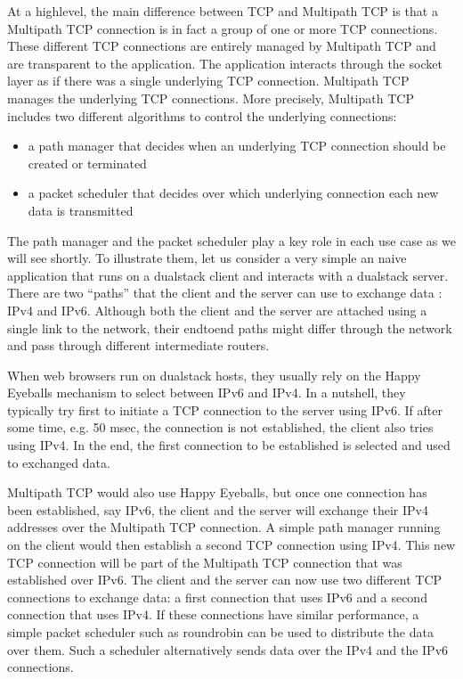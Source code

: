\documentclass[letterpaper,10pt,english]{sphinxmanual}
\begin{document}
\sphinxAtStartPar
At a high\sphinxhyphen{}level, the main difference between TCP and Multipath TCP is that a Multipath TCP connection is in fact a group of one or more TCP connections. These different TCP connections are entirely managed by Multipath TCP and are transparent to the application. The application interacts through the socket layer as if there was a single underlying TCP connection. Multipath TCP manages the underlying TCP connections. More precisely, Multipath TCP includes two different algorithms to control the underlying connections:
\begin{itemize}
\item {} 
\sphinxAtStartPar
a path manager that decides when an underlying TCP connection should be created or terminated

\item {} 
\sphinxAtStartPar
a packet scheduler that decides over which underlying connection each new data is transmitted

\end{itemize}

\sphinxAtStartPar
The path manager and the packet scheduler play a key role in each use case as we will see shortly. To illustrate them, let us consider a very simple an naive application that runs on a dual\sphinxhyphen{}stack client and interacts with a dual\sphinxhyphen{}stack server. There are two “paths” that the client and the server can use to exchange data : IPv4 and IPv6. Although both the client and the server are attached using a single link to the network, their end\sphinxhyphen{}to\sphinxhyphen{}end paths might differ through the network and pass through different intermediate routers.

\sphinxAtStartPar
When web browsers run on dual\sphinxhyphen{}stack hosts, they usually rely on the Happy Eyeballs mechanism to select between IPv6 and IPv4. In a nutshell, they typically try first to initiate a TCP connection to the server using IPv6. If after some time, e.g. 50 msec, the connection is not established, the client also tries using IPv4. In the end, the first connection to be established is selected and used to exchanged data.

\sphinxAtStartPar
Multipath TCP would also use Happy Eyeballs, but once one connection has been established, say IPv6, the client and the server will exchange their IPv4 addresses over the Multipath TCP connection. A simple path manager running on the client would then establish a second TCP connection using IPv4. This new TCP connection will be part of the Multipath TCP connection that was established over IPv6. The client and the server can now use two different TCP connections to exchange data: a first connection that uses IPv6 and a second connection that uses IPv4. If these connections have similar performance, a simple packet scheduler such as round\sphinxhyphen{}robin can be used to distribute the data over them. Such a scheduler alternatively sends data over the IPv4 and the IPv6 connections.
\end{document}
